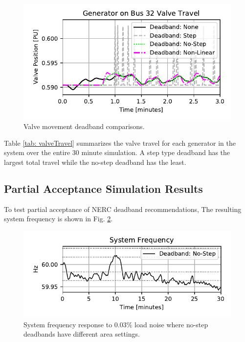 \begin{figure}[!ht]
\centering
\includegraphics[width=\linewidth]{figures/gen32ValveComp}
\caption{Valve movement deadband comparisons.}
\label{fig: valveComp}
\end{figure}

Table \ref{tab: valveTravel} summarizes the valve travel for each generator in the system over the entire 30 minute simulation. 
A step type deadband has the largest total travel while the no-step deadband has the least.




\subsection{Partial Acceptance Simulation Results}
To test partial acceptance of NERC deadband recommendations, 
The resulting system frequency is shown in Fig. \ref{fig: uniFreq}.

\begin{figure}[!ht]
\centering
\includegraphics[width=\linewidth]{figures/miniWECCuniAccFreq}
\caption{System frequency response to 0.03\% load noise where no-step deadbands have different area settings.}
\label{fig: uniFreq}
\end{figure}

